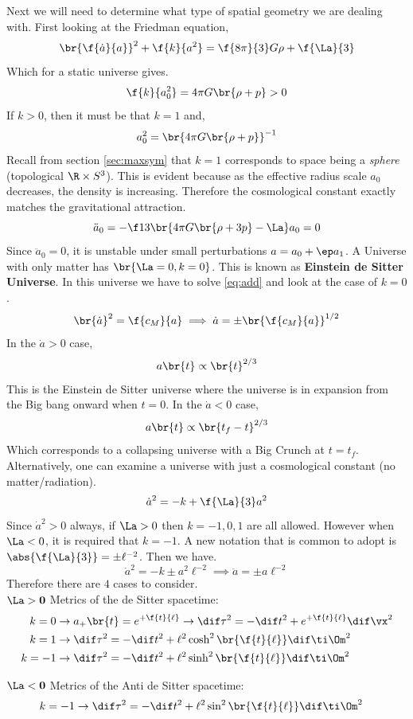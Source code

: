\documentclass{article}
\begin{document}
Next we will need to determine what type of spatial geometry we are dealing with. First looking at the Friedman equation,
\[ \br{\f{\dot{a}}{a}}^2 + \f{k}{a^2} = \f{8 \pi}{3} G \rho + \f{\La}{3} \]
Which for a static universe gives.
\[ \f{k}{a_0^2} = 4\pi G\br{\rho + p} > 0 \]
If $k > 0$, then it must be that $k = 1$ and,
\[ a_0^2 = \br{4\pi G\br{\rho + p}}^{-1} \]
Recall from section \ref{sec:maxsym} that $k=1$ corresponds to space being a \textit{sphere} (topological $\R \times S^3$). This is evident because as the effective radius scale $a_0$ decreases, the density is increasing. Therefore the cosmological constant exactly matches the gravitational attraction.
\[ \ddot{a}_0 = -\f13 \br{4\pi G \br{\rho + 3 p} - \La} a_0 = 0 \]
Since $\ddot{a}_0 = 0$, it is unstable under small perturbations $a = a_0 + \ep a_1$. A Universe with only matter has $\br{\La = 0, k = 0}$. This is known as \textbf{Einstein de Sitter Universe}. In this universe we have to solve \eqref{eq:add} and look at the case of $k = 0$.
\[ \br{\dot{a}}^2 = \f{c_M}{a} \implies \dot{a} = \pm\br{\f{c_M}{a}}^{1/2} \]
In the $\dot{a} > 0$ case,
\[ a\br{t} \propto \br{t}^{2/3} \]
This is the Einstein de Sitter universe where the universe is in expansion from the Big bang onward when $t = 0$. In the $\dot{a} < 0$ case,
\[ a\br{t} \propto \br{t_f - t}^{2/3} \]
Which corresponds to a collapsing universe with a Big Crunch at $t = t_f$. Alternatively, one can examine a universe with just a cosmological constant (no matter/radiation).
\[ \dot{a}^2 = -k + \f{\La}{3} a^2 \]
Since $\dot{a}^2 > 0$ always, if $\La > 0$ then $k=-1,0,1$ are all allowed. However when $\La < 0$, it is required that $k = -1$. A new notation that is common to adopt is $\abs{\f{\La}{3}} = \pm \ell^{-2}$. Then we have.
\[ \dot{a}^2 = -k \pm a^2 \ell^{-2} \implies \ddot{a} = \pm a \ell^{-2} \]
Therefore there are $4$ cases to consider.\\

$\mathbf{\La > 0}$ Metrics of the de Sitter spacetime:
\begin{align*}
k = 0 &\to a_+\br{t} = e^{+\f{t}{\ell}} \to \dif \tau^2 = - \dif t^2 + e^{+\f{t}{\ell}} \dif \vx^2 \\
k = 1 &\to \dif \tau^2 = - \dif t^2 + \ell^2 \cosh^2\br{\f{t}{\ell}} \dif \ti\Om^2 \\
k = -1 &\to \dif \tau^2 = - \dif t^2 + \ell^2 \sinh^2\br{\f{t}{\ell}} \dif \ti\Om^2
\end{align*}

$\mathbf{\La < 0}$ Metrics of the Anti de Sitter spacetime:
\begin{align*}
k = -1 &\to \dif \tau^2 = - \dif t^2 + \ell^2 \sin^2\br{\f{t}{\ell}} \dif \ti\Om^2
\end{align*}
\end{document}
